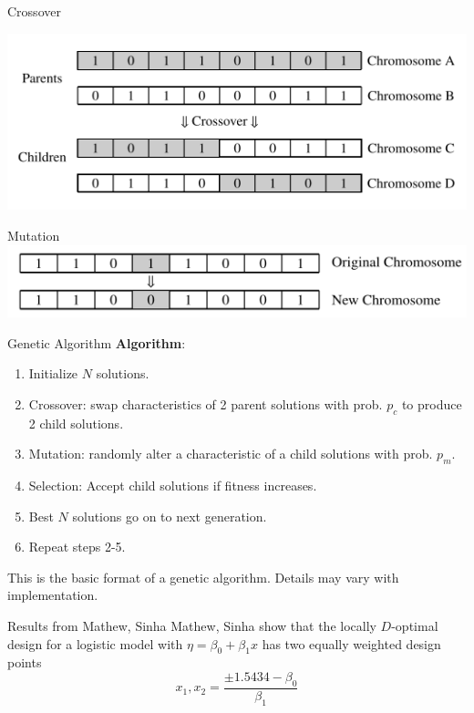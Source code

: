 \documentclass[11pt]{beamer}
\begin{document}
\begin{frame}{Crossover}

\centering
\includegraphics[scale=0.5]{crossover.png}


\end{frame}

\begin{frame}{Mutation}
\centering
\includegraphics[scale=0.5]{mutation.png}
\end{frame}

\begin{frame}{Genetic Algorithm}
\textbf{Algorithm}:
\begin{enumerate}
\item Initialize $N$ solutions.
\item Crossover: swap characteristics of 2 parent solutions with prob. $p_c$ to produce 2 child solutions.
\item Mutation: randomly alter a characteristic of a child solutions with prob. $p_m$.
\item Selection: Accept child solutions if fitness increases.
\item Best $N$ solutions go on to next generation.
\item Repeat steps 2-5.
\end{enumerate}
This is the basic format of a genetic algorithm. Details may vary with implementation.
\end{frame}

\begin{frame}{Results from Mathew, Sinha}
Mathew, Sinha show that the locally $D$-optimal design for a logistic model with $\eta = \beta_0 + \beta_1 x$ has two equally weighted design points
$$
x_1, x_2 = \frac{\pm 1.5434 - \beta_0}{\beta_1}
$$
\end{frame}
\end{document}
